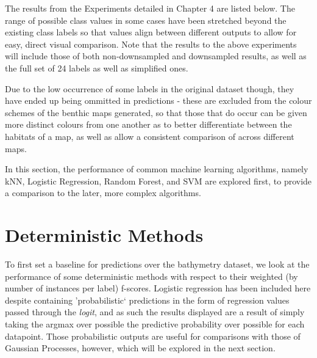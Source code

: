 The results from the Experiments detailed in Chapter 4 are listed below. The range of possible class values in some cases have been stretched beyond the existing class labels so that values align between different outputs to allow for easy, direct visual comparison. Note that the results to the above experiments will include those of both non-downsampled and downsampled results, as well as the full set of 24 labels as well as simplified ones.

Due to the low occurrence of some labels in the original dataset though, they have ended up being ommitted in predictions - these are excluded from the colour schemes of the benthic maps generated, so that those that do occur can be given more distinct colours from one another as to better differentiate between the habitats of a map, as well as allow a consistent comparison of across different maps.

In this section, the performance of common machine learning algorithms, namely kNN, Logistic Regression, Random Forest, and SVM are explored first, to provide a comparison to the later, more complex algorithms.


\pagebreak
\section{Deterministic Methods}

To first set a baseline for predictions over the bathymetry dataset, we look at the performance of some deterministic methods with respect to their weighted (by number of instances per label) f-scores. Logistic regression has been included here despite containing 'probabilistic` predictions in the form of regression values passed through the \textit{logit}, and as such the results displayed are a result of simply taking the argmax over possible the predictive probability over possible for each datapoint. Those probabilistic outputs are useful for comparisons with those of Gaussian Processes, however, which will be explored in the next section.

